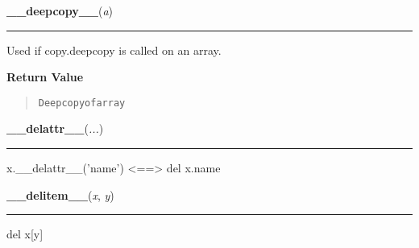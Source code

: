     \label{numpy:ndarray:__deepcopy__}

    \vspace{0.5ex}

    \begin{boxedminipage}{\textwidth}

    \raggedright \textbf{\_\_deepcopy\_\_}(\textit{a})

    \vspace{-1.5ex}

    \rule{\textwidth}{0.5\fboxrule}

Used if copy.deepcopy is called on an array.
    \vspace{1ex}

      \textbf{Return Value}
      \begin{quote}
\begin{alltt}
Deep copy of array
\end{alltt}

      \end{quote}

    \vspace{1ex}

    \end{boxedminipage}

    \label{object:__delattr__}

    \vspace{0.5ex}

    \begin{boxedminipage}{\textwidth}

    \raggedright \textbf{\_\_delattr\_\_}(\textit{...})

    \vspace{-1.5ex}

    \rule{\textwidth}{0.5\fboxrule}

x.{\_}{\_}delattr{\_}{\_}('name') {\textless}=={\textgreater} del x.name
    \vspace{1ex}

    \end{boxedminipage}

    \label{numpy:ndarray:__delitem__}

    \vspace{0.5ex}

    \begin{boxedminipage}{\textwidth}

    \raggedright \textbf{\_\_delitem\_\_}(\textit{x}, \textit{y})

    \vspace{-1.5ex}

    \rule{\textwidth}{0.5\fboxrule}

del x{[}y{]}
    \vspace{1ex}

    \end{boxedminipage}

